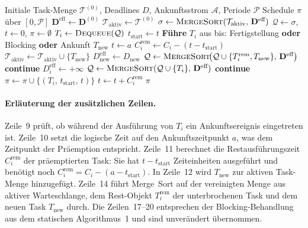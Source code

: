 ﻿\documentclass[a4paper,12pt]{article}
\theoremstyle{definition}
\begin{document}
	\begin{algorithm}[H]
		\caption{EDF$^+_{\mathrm{dyn}}$ -- Scheduling Algorithm for Dynamic Task Sets}
		\label{alg:edfdyn}
		\begin{algorithmic}[1]
			\Require Initiale Task-Menge $\mathcal{T}^{(0)}$, Deadlines $D$, Ankunftsstrom $\mathcal{A}$, Periode $\mathcal{P}$
			\Ensure Schedule $\pi$ über $[0,\mathcal{P}]$
			\State $\mathbf{D}^{\text{eff}} \leftarrow \mathbf{D}^{(0)}$
			\State $\mathcal{T}_{\text{aktiv}} \leftarrow \mathcal{T}^{(0)}$
			\State $\sigma \leftarrow \textsc{MergeSort}(\mathcal{T}_{\text{aktiv}},\, \mathbf{D}^{\text{eff}})$
			\State $\mathcal{Q} \leftarrow \sigma$, $t \leftarrow 0$, $\pi \leftarrow \emptyset$
			\State $T_i \leftarrow \textsc{Dequeue}(\mathcal{Q})$
			\State $t_{\text{start}} \leftarrow t$
			\State \textbf{Führe} $T_i$ aus bis: Fertigstellung \textbf{oder} Blocking \textbf{oder} Ankunft $T_{\text{new}}$
			\State $t \leftarrow a$ 
			\State $C_i^{\text{rem}} \leftarrow C_i - (t - t_{\text{start}})$ 
			\State $\mathcal{T}_{\text{aktiv}} \leftarrow \mathcal{T}_{\text{aktiv}} \cup \{T_{\text{new}}\}$
			\State $D_{\text{new}}^{\text{eff}} \leftarrow D_{\text{new}}$
			\State $\mathcal{Q} \leftarrow \textsc{MergeSort}\!\bigl(\mathcal{Q} \cup \{T_i^{\text{rem}}, T_{\text{new}}\},\, \mathbf{D}^{\text{eff}}\bigr)$
			\State \textbf{continue}
			\EndIf
			\State $D_i^{\text{eff}} \leftarrow +\infty$
			\State $\mathcal{Q} \leftarrow \textsc{MergeSort}(\mathcal{Q} \cup \{T_i\},\, \mathbf{D}^{\text{eff}})$
			\State \textbf{continue}
			\EndIf
			\State $\pi \leftarrow \pi \cup \{(T_i,\, t_{\text{start}},\, t)\}$
			\State $t \leftarrow t + C_i^{\text{rem}}$
			\EndWhile
			\State \Return $\pi$
		\end{algorithmic}
	\end{algorithm}

	\paragraph{Erläuterung der zusätzlichen Zeilen.}
	Zeile~9 prüft, ob während der Ausführung von $T_i$ ein Ankunftsereignis
	eingetreten ist. Zeile~10 setzt die logische Zeit auf den Ankunftszeitpunkt $a$,
	was dem Zeitpunkt der Präemption entspricht. Zeile~11 berechnet die
	Restausführungszeit $C_i^{\text{rem}}$ der präemptierten Task: Sie hat
	$t - t_{\text{start}}$ Zeiteinheiten ausgeführt und benötigt noch
	$C_i^{\text{rem}} = C_i - (a - t_{\text{start}})$. In Zeile~12 wird
	$T_{\text{new}}$ zur aktiven Task-Menge hinzugefügt. Zeile~14 führt Merge~Sort
	auf der vereinigten Menge aus aktiver Warteschlange, dem Rest-Objekt $T_i^{\text{rem}}$
	der unterbrochenen Task und dem neuen Task $T_{\text{new}}$ durch. Die Zeilen~17--20
	entsprechen der Blocking-Behandlung aus dem statischen Algorithmus~1 und sind
	unverändert übernommen.
\end{document}
